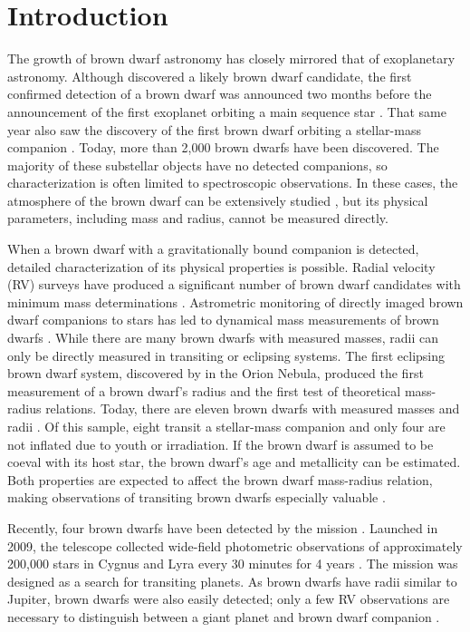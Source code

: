 
\section{Introduction}
\label{sec:intro}

The growth of brown dwarf astronomy has closely mirrored that of exoplanetary astronomy.
Although \citet{Latham89} discovered a likely brown dwarf candidate, the first confirmed detection of a brown dwarf was announced two months before the announcement of the first exoplanet orbiting a main sequence star \citep{Rebolo95, Mayor95}. 
That same year also saw the discovery of the first brown dwarf orbiting a stellar-mass companion \citep{Nakajima95}. 
Today, more than 2,000 brown dwarfs have been discovered.
The majority of these substellar objects have no detected companions, so characterization is often limited to spectroscopic observations.
In these cases, the atmosphere of the brown dwarf can be extensively studied \citep[e.g.][]{Burgasser14, Faherty14}, but its physical parameters, including mass and radius, cannot be measured directly.

When a brown dwarf with a gravitationally bound companion is detected, detailed characterization of its physical properties is possible. 
Radial velocity (RV) surveys have produced a significant number of brown dwarf candidates with minimum mass determinations \citep[e.g.][]{Patel07}. 
Astrometric monitoring of directly imaged brown dwarf companions to stars has led to dynamical mass measurements of brown dwarfs \citep{Liu02, Dupuy09, Crepp12a}.
While there are many brown dwarfs with measured masses, radii can only be directly measured in transiting or eclipsing systems.
The first eclipsing brown dwarf system, discovered by \citet{Stassun06} in the Orion Nebula, produced the first measurement of a brown dwarf's radius and the first test of theoretical mass-radius relations.
Today, there are eleven brown dwarfs with measured masses and radii \citep{Diaz14b}. 
Of this sample, eight transit a stellar-mass companion and only four are not inflated due to youth or irradiation.
If the brown dwarf is assumed to be coeval with its host star, the brown dwarf's age and metallicity can be estimated. Both properties are expected to affect the brown dwarf mass-radius relation, making observations of transiting brown dwarfs especially valuable \citep{Burrows11}. 

Recently, four brown dwarfs have been detected by the \itk{} mission \citep{Johnson11a, Bouchy11b, Diaz13, Moutou13}.
Launched in 2009, the \itk{} telescope collected wide-field photometric observations of approximately 200,000 stars in Cygnus and Lyra every 30 minutes for 4 years \citep{Borucki10}. 
The mission was designed as a search for transiting planets.
As brown dwarfs have radii similar to Jupiter, brown dwarfs were also easily detected; only a few RV observations are necessary to distinguish between a giant planet and brown dwarf companion \citep[e.g.][]{Moutou13}.

